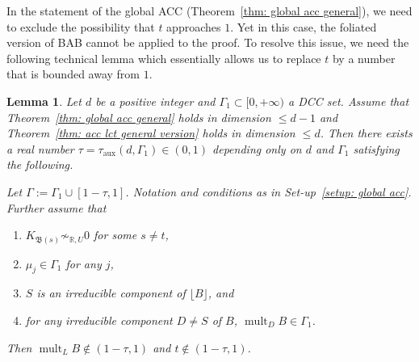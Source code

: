 \documentclass[11pt,reqno]{amsart}
\numberwithin{equation}{section}
\newcommand{\aux}{\operatorname{aux}}
\newcommand{\mult}{\operatorname{mult}}
\newcommand{\Bb}{{\mathfrak{B}}}
\newcommand{\Ii}{\Gamma}
\newtheorem{lem}[thm]{Lemma}
\theoremstyle{definition}
\begin{document}
In the statement of the global ACC (Theorem~\ref{thm: global acc general}), we need to exclude the possibility that $t$ approaches $1$. Yet in this case, the foliated version of BAB \cite[Theorem~B]{Cas+25a} cannot be applied to the proof. To resolve this issue, we need the following technical lemma which essentially allows us to replace $t$ by a number that is bounded away from $1$.

\begin{lem}\label{lem: one lc place one close to one}
Let $d$ be a positive integer and $\Ii_1\subset [0,+\infty)$ a DCC set. Assume that Theorem~\ref{thm: global acc general} holds in dimension $\leq d-1$ and Theorem~\ref{thm: acc lct general version} holds in dimension $\leq d$. Then there exists a real number $\tau=\tau_{\aux}(d,\Ii_1)\in (0,1)$ depending only on $d$ and $\Ii_1$ satisfying the following.

Let $\Ii:=\Ii_1\cup [1-\tau,1]$. Notation and conditions as in Set-up~\ref{setup: global acc}. Further assume that \begin{enumerate}
\item $K_{\Bb(s)}\not\sim_{\mathbb R,U}0$ for some $s\neq t$, 
    \item $\mu_j\in\Ii_1$ for any $j$,
    \item $S$ is an irreducible component of $\lfloor B\rfloor$, and
    \item for any irreducible component $D\neq S$
    of $B$, $\mult_DB\in\Ii_1$.
\end{enumerate}
Then $\mult_LB\not\in (1-\tau,1)$ and $t\not\in (1-\tau,1)$.
\end{lem}
\end{document}
